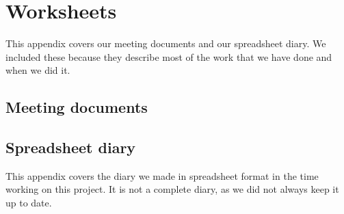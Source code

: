 \chapter{Worksheets}
\label{APP-WS}
This appendix covers our meeting documents and our spreadsheet diary. We
included these because they describe most of the work that we have done and when
we did it.

\section{Meeting documents}
\label{APP-WS-MD}


\section{Spreadsheet diary}
\label{APP-SS}
This appendix covers the diary we made in spreadsheet format in the time working
on this project. It is not a complete diary, as we did not always keep it up to
date. 

